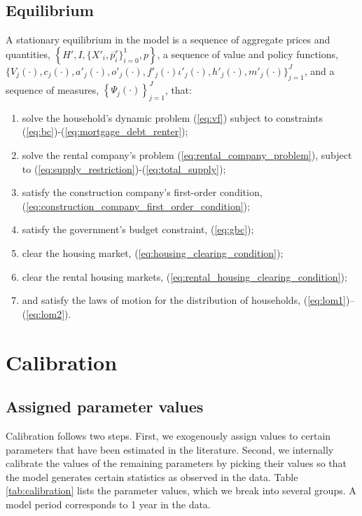 \documentclass[parskip=full]{article}
\begin{document}
\subsection{Equilibrium}
A stationary equilibrium in the model is a sequence of aggregate prices and quantities, $\left\{H',I,\{X'_{i},\overline{p}^{r}_{i}\}^{1}_{i=0},p\right\}$, a sequence of value and policy functions, $\biggl\{V_{j}(\cdot),c_{j}(\cdot),a'_{j}(\cdot),o'_{j}(\cdot),f'_{j}(\cdot)\iota'_{j}(\cdot),h'_{j}(\cdot),m'_{j}(\cdot)\biggl\}_{j=1}^J$, and a sequence of measures, $\left\{\Psi_{j}(\cdot)\right\}_{j=1}^J$, that:
\begin{enumerate}
\item solve the household's dynamic problem (\ref{eq:vf}) subject to constraints (\ref{eq:bc})-(\ref{eq:mortgage_debt_renter});
\item solve the rental company's problem (\ref{eq:rental_company_problem}), subject to (\ref{eq:supply_restriction})-(\ref{eq:total_supply});
\item satisfy the construction company's first-order condition, (\ref{eq:construction_company_first_order_condition});
\item satisfy the government's budget constraint, (\ref{eq:gbc});
\item clear the housing market,
(\ref{eq:housing_clearing_condition});
\item clear the rental housing markets,
(\ref{eq:rental_housing_clearing_condition});
\item and satisfy the laws of motion for the distribution of households, (\ref{eq:lom1})--(\ref{eq:lom2}).
\end{enumerate}

\section{Calibration}\label{sec:calibration}

\subsection{Assigned parameter values}
Calibration follows two steps. First, we exogenously assign values to certain parameters that have been estimated in the literature. Second, we internally calibrate the values of the remaining parameters by picking their values so that the model generates certain statistics as observed in the data. Table \ref{tab:calibration} lists the parameter values, which we break into several groups. A model period corresponds to 1 year in the data.
\end{document}
